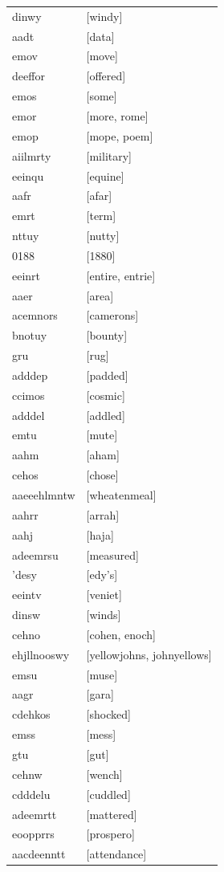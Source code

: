 \documentclass{article}
\begin{document}
\begin{tabular}{ll}
dinwy & [windy] \\
aadt & [data] \\
emov & [move] \\
deeffor & [offered] \\
emos & [some] \\
emor & [more, rome] \\
emop & [mope, poem] \\
aiilmrty & [military] \\
eeinqu & [equine] \\
aafr & [afar] \\
emrt & [term] \\
nttuy & [nutty] \\
0188 & [1880] \\
eeinrt & [entire, entrie] \\
aaer & [area] \\
acemnors & [camerons] \\
bnotuy & [bounty] \\
gru & [rug] \\
adddep & [padded] \\
ccimos & [cosmic] \\
adddel & [addled] \\
emtu & [mute] \\
aahm & [aham] \\
cehos & [chose] \\
aaeeehlmntw & [wheatenmeal] \\
aahrr & [arrah] \\
aahj & [haja] \\
adeemrsu & [measured] \\
'desy & [edy's] \\
eeintv & [veniet] \\
dinsw & [winds] \\
cehno & [cohen, enoch] \\
ehjllnooswy & [yellowjohns, johnyellows] \\
emsu & [muse] \\
aagr & [gara] \\
cdehkos & [shocked] \\
emss & [mess] \\
gtu & [gut] \\
cehnw & [wench] \\
cdddelu & [cuddled] \\
adeemrtt & [mattered] \\
eoopprrs & [prospero] \\
aacdeenntt & [attendance] \\

\end{tabular}
\end{document}
